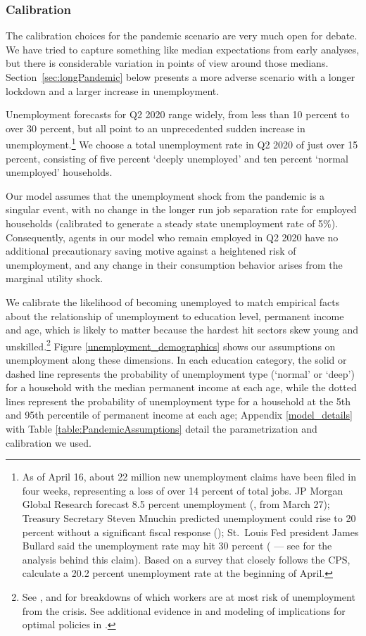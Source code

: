 \documentclass[titlepage,letterpaper]{\econtex}
\begin{document}
\subsubsection{Calibration}
The calibration choices for the pandemic scenario are very much open for debate. We have tried to capture something like median expectations from early analyses, but there is considerable variation in points of view around those medians.
Section~\ref{sec:longPandemic} below presents a more adverse scenario with a longer lockdown and a larger increase in unemployment.

Unemployment forecasts for Q2 2020 range widely, from less than 10 percent to over 30 percent, but all point to an unprecedented sudden increase in unemployment.\footnote{As of April 16, about 22 million new unemployment claims have been filed in four weeks, representing a loss of over 14 percent  of total jobs.  JP Morgan Global Research forecast 8.5 percent unemployment (\cite{JPMorganBlog2020}, from March 27); Treasury Secretary Steven Mnuchin predicted unemployment could rise to 20 percent without a significant fiscal response (\cite{Bloomberg1}); St.\ Louis Fed president James Bullard said the unemployment rate may hit 30 percent  (\cite{Bloomberg2} --- see \cite{FariaBlog2020} for the analysis behind this claim).  Based on a survey that closely follows the CPS, \cite{BickBlandin2020} calculate a 20.2 percent unemployment rate at the beginning of April.}
We choose a total unemployment rate in Q2 2020 of just over 15 percent, consisting of five percent `deeply unemployed' and ten percent `normal unemployed' households.

Our model assumes that the unemployment shock from the pandemic is a singular event, with no change in the longer run job separation rate for employed households (calibrated to generate a steady state unemployment rate of 5\%).
Consequently, agents in our model who remain employed in Q2 2020 have no additional precautionary saving motive against a heightened risk of unemployment, and any change in their consumption behavior arises from the marginal utility shock.

We calibrate the likelihood of becoming unemployed to match empirical facts about the relationship of unemployment to education level, permanent income and age, which is likely to matter because the hardest hit sectors skew young and unskilled.\footnote{See \cite{GasconCOVID2020}, \cite{LeiboviciSocial2020} and \cite{covid_USsurvey} for breakdowns of which workers are at most risk of unemployment from the crisis.
  See additional evidence in \cite{kmv_pandemics} and modeling of implications for optimal policies in \cite{healthWealth}.}
Figure \ref{unemployment_demographics} shows our assumptions on unemployment along these dimensions.
In each education category, the solid or dashed line represents the probability of unemployment type (`normal' or `deep') for a household with the median permanent income at each age, while the dotted lines represent the probability of unemployment type for a household at the 5th and 95th percentile of permanent income at each age; Appendix \ref{model_details} with Table \ref{table:PandemicAssumptions} detail the parametrization and calibration we used.
\end{document}

